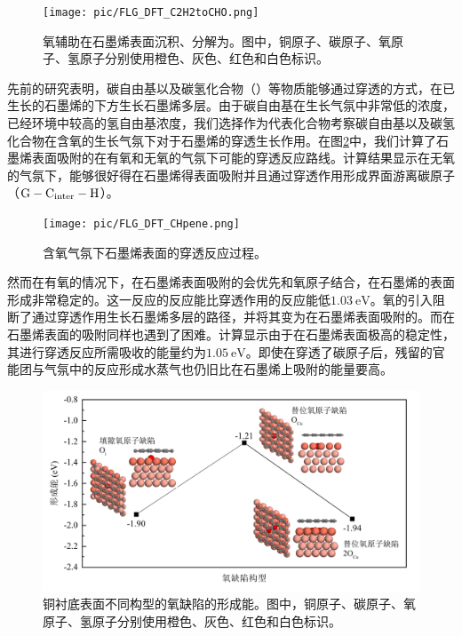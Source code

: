 \begin{figure}[htb]
    \texttt{[image: pic/FLG\_DFT\_C2H2toCHO.png]}
    \caption{氧辅助在石墨烯表面沉积、分解为。图中，铜原子、碳原子、氧原子、氢原子分别使用橙色、灰色、红色和白色标识。}
    \label{fig:FLG_DFT_C2H2toCHO}
\end{figure}

先前的研究表明，碳自由基以及碳氢化合物（）等物质能够通过穿透的方式，在已生长的石墨烯的下方生长石墨烯多层。由于碳自由基在生长气氛中非常低的浓度，已经环境中较高的氢自由基浓度，我们选择作为代表化合物考察碳自由基以及碳氢化合物在含氧的生长气氛下对于石墨烯的穿透生长作用。在图\ref{fig:FLG_DFT_CHpene}中，我们计算了石墨烯表面吸附的在有氧和无氧的气氛下可能的穿透反应路线。计算结果显示在无氧的气氛下，能够很好得在石墨烯得表面吸附并且通过穿透作用形成界面游离碳原子（$\rm G-C_{inter}-H$）。

\begin{figure}[htb]
    \texttt{[image: pic/FLG\_DFT\_CHpene.png]}
    \caption{含氧气氛下石墨烯表面的穿透反应过程。}
    \label{fig:FLG_DFT_CHpene}
\end{figure}

然而在有氧的情况下，在石墨烯表面吸附的会优先和氧原子结合，在石墨烯的表面形成非常稳定的。这一反应的反应能比穿透作用的反应能低$\SI{1.03}{\electronvolt}$。氧的引入阻断了通过穿透作用生长石墨烯多层的路径，并将其变为在石墨烯表面吸附的。而在石墨烯表面的吸附同样也遇到了困难。计算显示由于在石墨烯表面极高的稳定性，其进行穿透反应所需吸收的能量约为$\SI{1.05}{\electronvolt}$。即使在穿透了碳原子后，残留的官能团与气氛中的反应形成水蒸气也仍旧比在石墨烯上吸附的能量要高。

\begin{figure}[htb]
    \includegraphics{pic/FLG_DFT_Odefect.png}
    \caption{铜衬底表面不同构型的氧缺陷的形成能。图中，铜原子、碳原子、氧原子、氢原子分别使用橙色、灰色、红色和白色标识。}
    \label{fig:FLG_DFT_Odefect}
\end{figure}

